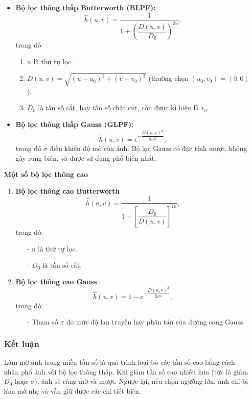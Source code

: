 \documentclass[12pt,a4paper]{report}
\numberwithin{equation}{section}
\theoremstyle{definition} %
\begin{document}
\begin{itemize}
	\item \textbf{Bộ lọc thông thấp Butterworth (BLPF):}
	\[
	\hat{h}(u,v) = \frac{1}{1 + \left(\dfrac{D(u,v)}{D_0}\right)^{2n}},
	\]
	trong đó
	\begin{enumerate}[label=$-$]
	\item 	$n$ là thứ tự lọc.
	\item  $D(u,v) = \sqrt{(u-u_0)^2 + (v-v_0)^2}$ (thường chọn $(u_0,v_0) = (0,0)$).
	\item $D_0$ là tần số cắt, hay tần số chặt cụt, còn được kí hiệu là $r_0$.
	\end{enumerate}

	\item \textbf{Bộ lọc thông thấp Gauss (GLPF):}
	\[
	\hat{h}(u,v) = e^{-\dfrac{D(u,v)^2}{2\sigma^2}},
	\]
	trong đó $\sigma$ điều khiển độ mờ của ảnh. Bộ lọc Gauss có đặc tính mượt, không gây rung biên, và được sử dụng phổ biến nhất.
	
\end{itemize}
\begin{center}
\textbf{Một số bộ lọc thông cao}
\end{center}
\begin{enumerate}[label=$\bullet$]
\item \textbf{Bộ lọc thông cao Butterworth}
\[\hat{h}(u,v) = \frac{1}{1 + \left[\dfrac{D_0}{D(u,v)}\right]^{2n}},\]
trong đó: 
\begin{enumerate}
	\item[-] n là thứ tự lọc.
	\item[-] $D_0$ là tần số cắt.

\end{enumerate}

\item \textbf{Bộ lọc thông cao Gauss}
\[\hat{h}(u,v) = 1- e^{-\dfrac{D(u,v)^2}{2\sigma^2}},\]
trong đó: 
\begin{enumerate}
\item[-] Tham số $\sigma$ đo mức độ lan truyền hay phân tán của đường cong Gauss.
\end{enumerate}
\end{enumerate}



\subsubsection*{Kết luận}
Làm mờ ảnh trong miền tần số là quá trình loại bỏ các tần số cao bằng cách nhân phổ ảnh với bộ lọc thông thấp.  
Khi giảm tần số cao nhiều hơn (tức là giảm $D_0$ hoặc $\sigma$), ảnh sẽ càng mờ và mượt.  
Ngược lại, nếu chọn ngưỡng lớn, ảnh chỉ bị làm mờ nhẹ và vẫn giữ được các chi tiết biên.
\end{document}
